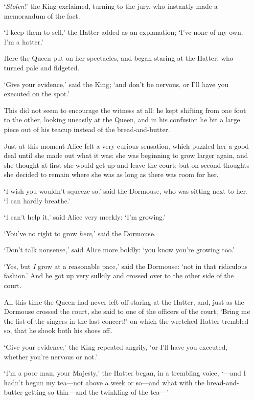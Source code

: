 \documentclass[12pt,openany]{memoir}
\begin{document}
`\textit{Stolen}!' the King exclaimed, turning to the jury, who instantly made a memorandum of the fact.

`I keep them to sell,' the Hatter added as an explanation; `I've none of my own. I'm a hatter.'

Here the Queen put on her spectacles, and began staring at the Hatter, who turned pale and fidgeted.

`Give your evidence,' said the King; `and don't be nervous, or I'll have you executed on the spot.'

This did not seem to encourage the witness at all: he kept shifting from one foot to the other, looking uneasily at the Queen, and in his confusion he bit a large piece out of his teacup instead of the bread-and-butter.

Just at this moment Alice felt a very curious sensation, which puzzled her a good deal until she made out what it was: she was beginning to grow larger again, and she thought at first she would get up and leave the court; but on second thoughts she decided to remain where she was as long as there was room for her.

`I wish you wouldn't squeeze so.' said the Dormouse, who was sitting next to her. `I can hardly breathe.'

`I can't help it,' said Alice very meekly: `I'm growing.'

`You've no right to grow \textit{here},' said the Dormouse.

`Don't talk nonsense,' said Alice more boldly: `you know you're growing too.'

`Yes, but \textit{I} grow at a reasonable pace,' said the Dormouse: `not in that ridiculous fashion.' And he got up very sulkily and crossed over to the other side of the court.

All this time the Queen had never left off staring at the Hatter, and, just as the Dormouse crossed the court, she said to one of the officers of the court, `Bring me the list of the singers in the last concert!' on which the wretched Hatter trembled so, that he shook both his shoes off.

`Give your evidence,' the King repeated angrily, `or I'll have you executed, whether you're nervous or not.'

`I'm a poor man, your Majesty,' the Hatter began, in a trembling voice, `---and I hadn't begun my tea---not above a week or so---and what with the bread-and-butter getting so thin---and the twinkling of the tea---'
\end{document}
